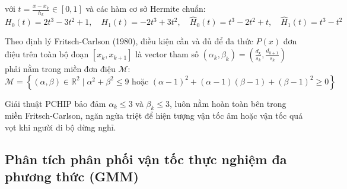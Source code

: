 với $t = \frac{x - x_k}{h_k} \in [0, 1]$ và các hàm cơ sở Hermite chuẩn:
\begin{equation}
H_0(t) = 2t^3 - 3t^2 + 1, \quad H_1(t) = -2t^3 + 3t^2, \quad \hat{H}_0(t) = t^3 - 2t^2 + t, \quad \hat{H}_1(t) = t^3 - t^2
\label{eq:hermite-basis-functions}
\end{equation}

Theo định lý Fritsch-Carlson (1980), điều kiện cần và đủ để đa thức $P(x)$ đơn điệu trên toàn bộ đoạn $[x_k, x_{k+1}]$ là vector tham số $(\alpha_k, \beta_k) = \left( \frac{d_k}{s_k}, \frac{d_{k+1}}{s_k} \right)$ phải nằm trong miền đơn điệu $\mathcal{M}$:
\begin{equation}
\mathcal{M} = \left\{ (\alpha, \beta) \in \mathbb{R}^2 \mid \alpha^2 + \beta^2 \le 9 \text{ hoặc } (\alpha - 1)^2 + (\alpha - 1)(\beta - 1) + (\beta - 1)^2 \ge 0 \right\}
\label{eq:fritsch-carlson-region}
\end{equation}

\begin{table}[H]
\centering
\caption{So sánh năng lượng uốn cong và tính đơn điệu giữa các phương pháp nội suy}
\label{tab:interpolation-bending-energy}
\end{table}

Giải thuật PCHIP bảo đảm $\alpha_k \le 3$ và $\beta_k \le 3$, luôn nằm hoàn toàn bên trong miền Fritsch-Carlson, ngăn ngừa triệt để hiện tượng vận tốc âm hoặc vận tốc quá vọt khi người đi bộ dừng nghỉ.

\subsection{Phân tích phân phối vận tốc thực nghiệm đa phương thức (GMM)}

